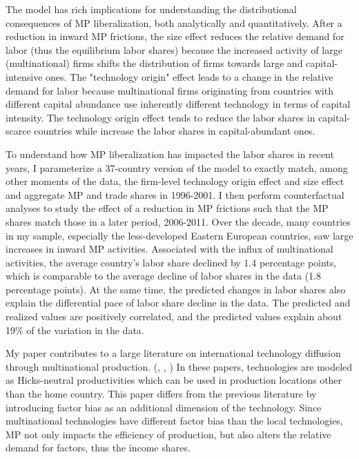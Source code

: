 \documentclass[notitlepage,11pt]{article}%
\begin{document}
The model has rich implications for understanding the distributional
consequences of MP liberalization, both analytically and quantitatively. After
a reduction in inward MP frictions, the size effect reduces the relative
demand for labor (thus the equilibrium labor shares) because the increased
activity of large (multinational) firms shifts the distribution of firms
towards large and capital-intensive ones. The "technology origin" effect leads
to a change in the relative demand for labor because multinational firms
originating from countries with different capital abundance use inherently
different technology in terms of capital intensity. The technology origin
effect tends to reduce the labor shares in capital-scarce countries while
increase the labor shares in capital-abundant ones.

To understand how MP liberalization has impacted the labor shares in recent
years, I parameterize a 37-country version of the model to exactly match,
among other moments of the data, the firm-level technology origin effect and
size effect and aggregate MP and trade shares in 1996-2001. I then perform
counterfactual analyses to study the effect of a reduction in MP frictions
such that the MP shares match those in a later period, 2006-2011. Over the
decade, many countries in my sample, especially the less-developed Eastern
European countries, saw large increases in inward MP activities. Associated
with the influx of multinational activities, the average country's labor share
declined by 1.4 percentage points, which is comparable to the average decline
of labor shares in the data (1.8 percentage points). At the same time, the
predicted changes in labor shares also explain the differential pace of labor
share decline in the data. The predicted and realized values are positively
correlated, and the predicted values explain about 19\% of the variation in
the data.

My paper contributes to a large literature on international technology
diffusion through multinational production. (\cite{ramondo_trade_2013},
\cite{arkolakis_innovation_2013}, \cite{tintelnot_global_2014}) In these
papers, technologies are modeled as Hicks-neutral productivities which can be
used in production locations other than the home country. This paper differs
from the previous literature by introducing factor bias as an additional
dimension of the technology. Since multinational technologies have different
factor bias than the local technologies, MP not only impacts the efficiency of
production, but also alters the relative demand for factors, thus the income shares.
\end{document}

